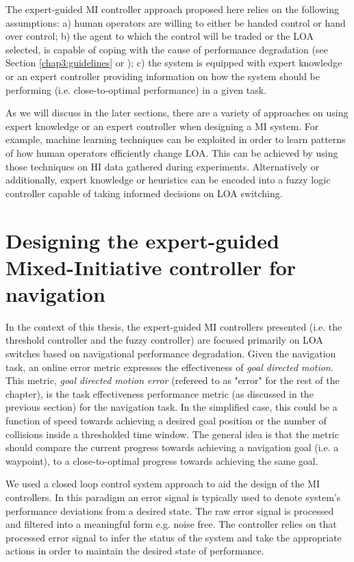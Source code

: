 \documentclass[a4paper,12pt,oneside,openright]{bhamthesis}
\begin{document}
The expert-guided MI controller approach proposed here relies on the following assumptions: a) human operators are willing to either be handed control or hand over control; b) the agent to which the control will be traded or the LOA selected, is capable of coping with the cause of performance degradation (see Section \ref{chap3:guidelines} or \citep{Chiou2015}); c) the system is equipped with expert knowledge or an expert controller providing information on how the system should be performing (i.e. close-to-optimal performance) in a given task. 

As we will discuss in the later sections, there are a variety of approaches on using expert knowledge or an expert controller when designing a MI system. For example, machine learning techniques can be exploited in order to learn patterns of how human operators efficiently change LOA. This can be achieved by using those techniques on HI data gathered during experiments. Alternatively or additionally, expert knowledge or heuristics can be encoded into a fuzzy logic controller capable of taking informed decisions on LOA switching.


\section{Designing the expert-guided Mixed-Initiative controller for navigation}
\label{chapter5:designing_MI_nav}

In the context of this thesis, the expert-guided MI controllers presented (i.e. the threshold controller and the fuzzy controller) are focused primarily on LOA switches based on navigational performance degradation. Given the navigation task, an online error metric expresses the effectiveness of \textit{goal directed motion}. This metric, \textit{goal directed motion error} (refereed to as "error" for the rest of the chapter), is the task effectiveness performance metric (as discussed in the previous section) for the navigation task. In the simplified case, this could be a function of speed towards achieving a desired goal position \citep{Olsen2003} or the number of collisions inside a thresholded time window. The general idea is that the metric should compare the current progress towards achieving a navigation goal (i.e. a waypoint), to a close-to-optimal progress towards achieving the same goal. 

We used a closed loop control system approach to aid the design of the MI controllers. In this paradigm an error signal is typically used to denote system's performance deviations from a desired state. The raw error signal is processed and filtered into a meaningful form e.g. noise free. The controller relies on that processed error signal to infer the status of the system and take the appropriate actions in order to maintain the desired state of performance. 
\end{document}
